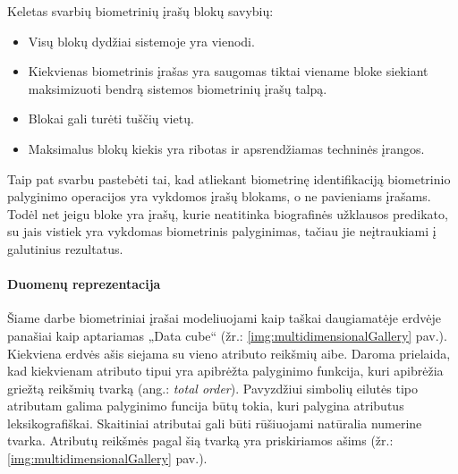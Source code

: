 Keletas svarbių biometrinių įrašų blokų savybių:
\begin{itemize}
\item Visų blokų dydžiai sistemoje yra vienodi.
\item Kiekvienas biometrinis įrašas yra saugomas tiktai viename bloke siekiant maksimizuoti bendrą sistemos biometrinių įrašų talpą.
\item Blokai gali turėti tuščių vietų.
\item Maksimalus blokų kiekis yra ribotas ir apsrendžiamas techninės įrangos.
\end{itemize}

Taip pat svarbu pastebėti tai, kad atliekant biometrinę identifikaciją biometrinio palyginimo operacijos yra vykdomos įrašų blokams, o ne pavieniams įrašams.
Todėl net jeigu bloke yra įrašų, kurie neatitinka biografinės užklausos predikato, su jais vistiek yra vykdomas biometrinis palyginimas, tačiau jie neįtraukiami į galutinius rezultatus.


\paragraph{Duomenų reprezentacija}

Šiame darbe biometriniai įrašai modeliuojami kaip taškai daugiamatėje erdvėje panašiai kaip \cite{marcel2000modeling} aptariamas „Data cube“ (žr.: \ref{img:multidimensionalGallery} pav.).
Kiekviena erdvės ašis siejama su vieno atributo reikšmių aibe.
Daroma prielaida, kad kiekvienam atributo tipui yra apibrėžta palyginimo funkcija, kuri apibrėžia griežtą reikšmių tvarką (ang.: {\it total order}).
Pavyzdžiui simbolių eilutės tipo atributam galima palyginimo funcija būtų tokia, kuri palygina atributus leksikografiškai.
Skaitiniai atributai gali būti rūšiuojami natūralia numerine tvarka.
Atributų reikšmės pagal šią tvarką yra priskiriamos ašims (žr.: \ref{img:multidimensionalGallery} pav.).


